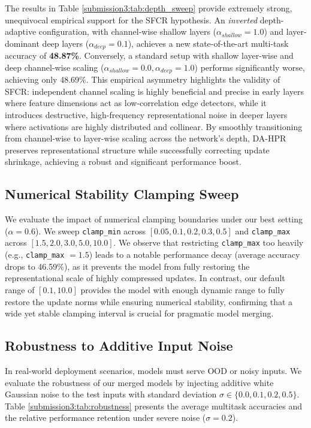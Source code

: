 \documentclass{article}
\theoremstyle{plain}
\theoremstyle{definition}
\theoremstyle{remark}
\begin{document}
The results in Table \ref{submission3:tab:depth_sweep} provide extremely strong, unequivocal empirical support for the SFCR hypothesis.
An \emph{inverted} depth-adaptive configuration, with channel-wise shallow layers ($\alpha_{shallow} = 1.0$) and layer-dominant deep layers ($\alpha_{deep} = 0.1$), achieves a new state-of-the-art multi-task accuracy of \textbf{48.87\%}.
Conversely, a standard setup with shallow layer-wise and deep channel-wise scaling ($\alpha_{shallow} = 0.0, \alpha_{deep} = 1.0$) performs significantly worse, achieving only 48.69\%.
This empirical asymmetry highlights the validity of SFCR:
independent channel scaling is highly beneficial and precise in early layers where feature dimensions act as low-correlation edge detectors, while it introduces destructive, high-frequency representational noise in deeper layers where activations are highly distributed and collinear.
By smoothly transitioning from channel-wise to layer-wise scaling across the network's depth, DA-HPR preserves representational structure while successfully correcting update shrinkage, achieving a robust and significant performance boost.

\subsection{Numerical Stability Clamping Sweep}
We evaluate the impact of numerical clamping boundaries under our best setting ($\alpha=0.6$).
We sweep \texttt{clamp\_min} across $[0.05, 0.1, 0.2, 0.3, 0.5]$ and \texttt{clamp\_max} across $[1.5, 2.0, 3.0, 5.0, 10.0]$.
We observe that restricting \texttt{clamp\_max} too heavily (e.g., \texttt{clamp\_max} $= 1.5$) leads to a notable performance decay (average accuracy drops to 46.59\%), as it prevents the model from fully restoring the representational scale of highly compressed updates.
In contrast, our default range of $[0.1, 10.0]$ provides the model with enough dynamic range to fully restore the update norms while ensuring numerical stability, confirming that a wide yet stable clamping interval is crucial for pragmatic model merging.

\subsection{Robustness to Additive Input Noise}
In real-world deployment scenarios, models must serve OOD or noisy inputs.
We evaluate the robustness of our merged models by injecting additive white Gaussian noise to the test inputs with standard deviation $\sigma \in \{0.0, 0.1, 0.2, 0.5\}$.
Table \ref{submission3:tab:robustness} presents the average multitask accuracies and the relative performance retention under severe noise ($\sigma = 0.2$).
\end{document}
